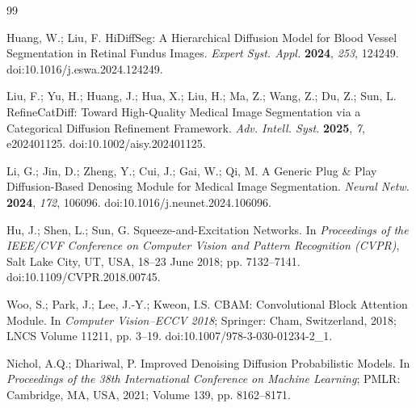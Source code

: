\documentclass[jimaging,article,submit,pdftex,moreauthors]{Definitions/mdpi}%
\providecommand{\href}[2]{#2}
\begin{document}
\begin{thebibliography}{99}

Huang, W.; Liu, F. HiDiffSeg: A Hierarchical Diffusion Model for Blood Vessel Segmentation in Retinal Fundus Images. \textit{Expert Syst. Appl.} \textbf{2024}, \textit{253}, 124249. \href{https://doi.org/10.1016/j.eswa.2024.124249}{doi:10.1016/j.eswa.2024.124249}.




Liu, F.; Yu, H.; Huang, J.; Hua, X.; Liu, H.; Ma, Z.; Wang, Z.; Du, Z.; Sun, L. RefineCatDiff: Toward High-Quality Medical Image Segmentation via a Categorical Diffusion Refinement Framework. \textit{Adv. Intell. Syst.} \textbf{2025}, \textit{7}, e202401125. \href{https://doi.org/10.1002/aisy.202401125}{doi:10.1002/aisy.202401125}.




Li, G.; Jin, D.; Zheng, Y.; Cui, J.; Gai, W.; Qi, M. A Generic Plug \& Play Diffusion-Based Denosing Module for Medical Image Segmentation. \textit{Neural Netw.} \textbf{2024}, \textit{172}, 106096. \href{https://doi.org/10.1016/j.neunet.2024.106096}{doi:10.1016/j.neunet.2024.106096}.




Hu, J.; Shen, L.; Sun, G. Squeeze-and-Excitation Networks. In \textit{Proceedings of the IEEE/CVF Conference on Computer Vision and Pattern Recognition (CVPR)}, Salt Lake City, UT, USA, 18--23 June 2018; pp. 7132--7141. \href{https://doi.org/10.1109/CVPR.2018.00745}{doi:10.1109/CVPR.2018.00745}.




Woo, S.; Park, J.; Lee, J.-Y.; Kweon, I.S. CBAM: Convolutional Block Attention Module. In \textit{Computer Vision--ECCV 2018}; Springer: Cham, Switzerland, 2018; LNCS Volume 11211, pp. 3--19. \href{https://doi.org/10.1007/978-3-030-01234-2_1}{doi:10.1007/978-3-030-01234-2\_1}.




Nichol, A.Q.; Dhariwal, P. Improved Denoising Diffusion Probabilistic Models. In \textit{Proceedings of the 38th International Conference on Machine Learning}; PMLR: Cambridge, MA, USA, 2021; Volume 139, pp. 8162--8171.





\end{thebibliography}
\end{document}
